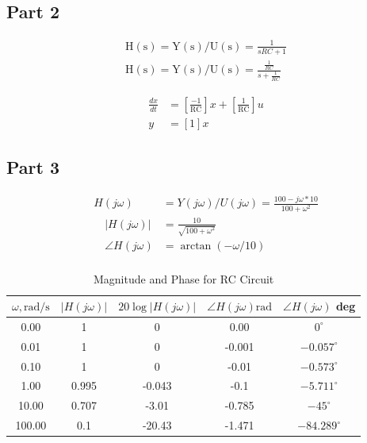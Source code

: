 \documentclass[12pt]{article}
\begin{document}
		\subsection{Part 2}
		\begin{equation}
			\begin{aligned}
				\mathrm{H}(\mathrm{s})=\mathrm{Y}(\mathrm{s}) / \mathrm{U}(\mathrm{s})=\frac{1}{s R C+1} \\ 	\mathrm{H}(\mathrm{s})=\mathrm{Y}(\mathrm{s}) / \mathrm{U}(\mathrm{s})=\frac{\frac{1}{R C}}{s+\frac{1}{R C}}
			\end{aligned}
		\end{equation}
		
		\begin{equation}
			\begin{aligned}
				\frac{d x}{d t} & =\left[\frac{-1}{\mathrm{RC}}\right] x+\left[\frac{1}{\mathrm{RC}}\right] u \\
				y & =[1] x
			\end{aligned}
		\end{equation}
		\subsection{Part 3}
		\begin{equation}
			\begin{aligned}
				H(j \omega) & = Y(j \omega) / U(j \omega)=\frac{100-j \omega * 10}{100+\omega^2} \\
				\quad|H(j \omega)| & = \frac{10}{\sqrt{100+\omega^2}} \\
				\quad \angle H(j \omega) & = \arctan (-\omega / 10) \\
			\end{aligned}
		\end{equation}
		
		\begin{table}[H]
			\centering
			\caption{Magnitude and Phase for RC Circuit}
		\begin{tabular}{|c|c|c|c|c|}			
			\hline$\omega, \mathrm{rad} / \mathrm{s}$ & $|H(j \omega)|$ & $20 \log |H(j \omega)|$ & $\angle H(j \omega) \mathrm{rad}$ & $\angle H(j \omega)$ deg \\
			\hline 0.00 & 1 & 0 &  0.00 & $0^{\circ}$ \\
			\hline 0.01 & 1& 0 & -0.001 & $-0.057^{\circ}$ \\
			\hline 0.10 & 1  & 0 & -0.01 & $-0.573^{\circ}$ \\
			\hline 1.00 &  0.995  &-0.043 & -0.1 & $-5.711^{\circ}$ \\
			\hline 10.00 &  0.707 & -3.01& -0.785 & $-45^{\circ}$ \\
			\hline 100.00 & 0.1 & -20.43 & -1.471  & $-84.289^{\circ}$ \\
			\hline
		\end{tabular}
		\label{tab:rc}
	\end{table}
\end{document}
